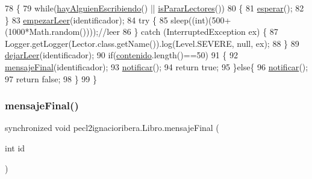 \begin{DoxyCode}
78      \{
79          \textcolor{keywordflow}{while}(\mbox{\hyperlink{classpecl2ignacioribera_1_1_libro_ab8a6fd43e4d95068bbb7cfbcf5ff04a5}{hayAlguienEscribiendo}}() || \mbox{\hyperlink{classpecl2ignacioribera_1_1_libro_a5d5ef2c83d96944b1d043e9fb5378edd}{isPararLectores}}())
80          \{
81              \mbox{\hyperlink{classpecl2ignacioribera_1_1_libro_a4c83b4f2726cfe98dcac1feb72e39b02}{esperar}}();
82          \}
83          \mbox{\hyperlink{classpecl2ignacioribera_1_1_libro_a62a722c8f7e5675f5ab3561a86eda1c1}{empezarLeer}}(identificador);
84          \textcolor{keywordflow}{try} \{
85              sleep((\textcolor{keywordtype}{int})(500+(1000*Math.random())));\textcolor{comment}{//leer}
86          \} \textcolor{keywordflow}{catch} (InterruptedException ex) \{
87              Logger.getLogger(Lector.class.getName()).log(Level.SEVERE, null, ex);
88          \}
89          \mbox{\hyperlink{classpecl2ignacioribera_1_1_libro_abd96718ab4e489e84f69dc24a7229f18}{dejarLeer}}(identificador);
90          \textcolor{keywordflow}{if}(\mbox{\hyperlink{classpecl2ignacioribera_1_1_libro_acb52ac741427b64544c1f65b6bbb898a}{contenido}}.length()==50)
91          \{
92              \mbox{\hyperlink{classpecl2ignacioribera_1_1_libro_a76e984080b5b46f17b7f7c7a1d880779}{mensajeFinal}}(identificador);
93              \mbox{\hyperlink{classpecl2ignacioribera_1_1_libro_a44cfbf7f47ada045300c48a3712aa804}{notificar}}();
94              \textcolor{keywordflow}{return} \textcolor{keyword}{true};
95          \}\textcolor{keywordflow}{else}\{
96              \mbox{\hyperlink{classpecl2ignacioribera_1_1_libro_a44cfbf7f47ada045300c48a3712aa804}{notificar}}();
97              \textcolor{keywordflow}{return} \textcolor{keyword}{false};
98          \}
99      \}
\end{DoxyCode}
\mbox{\label{classpecl2ignacioribera_1_1_libro_a76e984080b5b46f17b7f7c7a1d880779}} 
\subsubsection{\texorpdfstring{mensaje\+Final()}{mensajeFinal()}}
{\footnotesize\ttfamily synchronized void pecl2ignacioribera.\+Libro.\+mensaje\+Final (\begin{DoxyParamCaption}\item[{int}]{id }\end{DoxyParamCaption})\hspace{0.3cm}{\ttfamily [inline]}}


